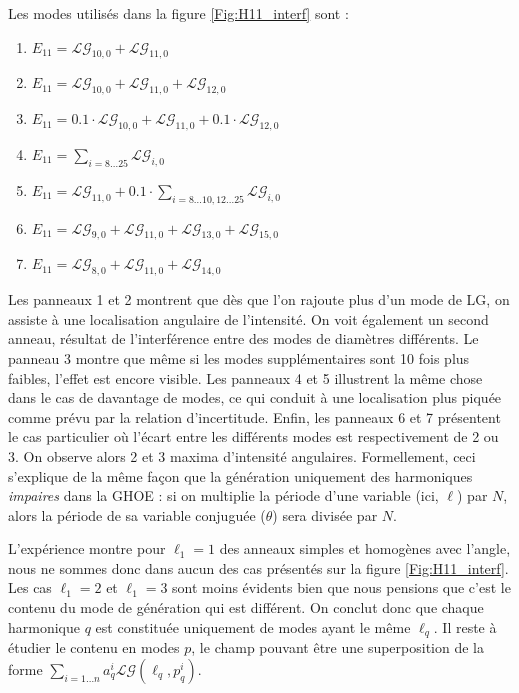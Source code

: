Les modes utilisés dans la figure \ref{Fig:H11_interf} sont :
\begin{enumerate}[1{.}]
\item $E_{11} = \mathcal{LG}_{10,0}+\mathcal{LG}_{11,0}$
\item $E_{11} = \mathcal{LG}_{10,0}+\mathcal{LG}_{11,0}+\mathcal{LG}_{12,0}$
\item $E_{11} = 0.1\cdot\mathcal{LG}_{10,0}+\mathcal{LG}_{11,0}+0.1\cdot\mathcal{LG}_{12,0}$
\item $E_{11} = \sum_{i=8\ldots 25} \mathcal{LG}_{i,0}$
\item $E_{11} = \mathcal{LG}_{11,0}+0.1\cdot\sum_{i=8\ldots10,12\ldots 25} \mathcal{LG}_{i,0}$
\item $E_{11} = \mathcal{LG}_{9,0}+\mathcal{LG}_{11,0}+\mathcal{LG}_{13,0}+\mathcal{LG}_{15,0}$
\item $E_{11} = \mathcal{LG}_{8,0}+\mathcal{LG}_{11,0}+\mathcal{LG}_{14,0}$
\end{enumerate}
Les panneaux 1 et 2 montrent que dès que l'on rajoute plus d'un mode de LG, on assiste à une localisation angulaire de l'intensité. On voit également un second anneau, résultat de l'interférence entre des modes de diamètres différents. Le panneau 3 montre que même si les modes supplémentaires sont 10 fois plus faibles, l'effet est encore visible. Les panneaux 4 et 5 illustrent la même chose dans le cas de davantage de modes, ce qui conduit à une localisation plus piquée comme prévu par la relation d'incertitude. Enfin, les panneaux 6 et 7 présentent le cas particulier où l'écart entre les différents modes est respectivement de 2 ou 3. On observe alors 2 et 3 maxima d'intensité angulaires. Formellement, ceci s'explique de la même façon que la génération uniquement des harmoniques \textit{impaires} dans la GHOE : si on multiplie la période d'une variable (ici, $\ell$) par $N$, alors la période de sa variable conjuguée ($\theta$) sera divisée par $N$.

L'expérience montre pour $\ell_{1} = 1$ des anneaux simples et homogènes avec l'angle, nous ne sommes donc dans aucun des cas présentés sur la figure \ref{Fig:H11_interf}. Les cas $\ell_1=2$ et $\ell_1=3$ sont moins évidents bien que nous pensions que c'est le contenu du mode de génération qui est différent. On conclut donc que chaque harmonique $q$ est constituée uniquement de modes ayant le même $\ell_{q}$. Il reste à étudier le contenu en modes $p$, le champ pouvant être une superposition de la forme $\sum_{i=1\ldots n}a_q^i\mathcal{LG}(\ell_q,p_q^i)$.

